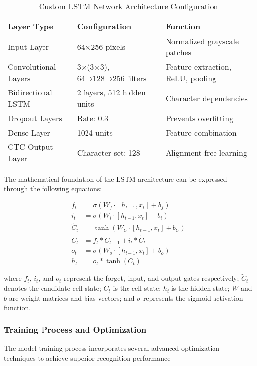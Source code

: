 \begin{table}[H]
\centering
\small
\caption{Custom LSTM Network Architecture Configuration}
\label{tab:lstm_architecture}
\begin{tabular}{lll}
\toprule
\textbf{Layer Type} & \textbf{Configuration} & \textbf{Function} \\
\midrule
Input Layer & 64×256 pixels & Normalized grayscale patches \\
Convolutional Layers & 3×(3×3), 64→128→256 filters & Feature extraction, ReLU, pooling \\
Bidirectional LSTM & 2 layers, 512 hidden units & Character dependencies \\
Dropout Layers & Rate: 0.3 & Prevents overfitting \\
Dense Layer & 1024 units & Feature combination \\
CTC Output Layer & Character set: 128 & Alignment-free learning \\
\bottomrule
\end{tabular}
\end{table}

The mathematical foundation of the LSTM architecture can be expressed through the following equations:

\begin{align}
    f_t &= \sigma(W_f \cdot [h_{t-1}, x_t] + b_f) \\
    i_t &= \sigma(W_i \cdot [h_{t-1}, x_t] + b_i) \\
    \tilde{C}_t &= \tanh(W_C \cdot [h_{t-1}, x_t] + b_C) \\
    C_t &= f_t * C_{t-1} + i_t * \tilde{C}_t \\
    o_t &= \sigma(W_o \cdot [h_{t-1}, x_t] + b_o) \\
    h_t &= o_t * \tanh(C_t)
\end{align}

where $f_t$, $i_t$, and $o_t$ represent the forget, input, and output gates respectively; $\tilde{C}_t$ denotes the candidate cell state; $C_t$ is the cell state; $h_t$ is the hidden state; $W$ and $b$ are weight matrices and bias vectors; and $\sigma$ represents the sigmoid activation function.

\subsubsection{Training Process and Optimization}

The model training process incorporates several advanced optimization techniques to achieve superior recognition performance:


